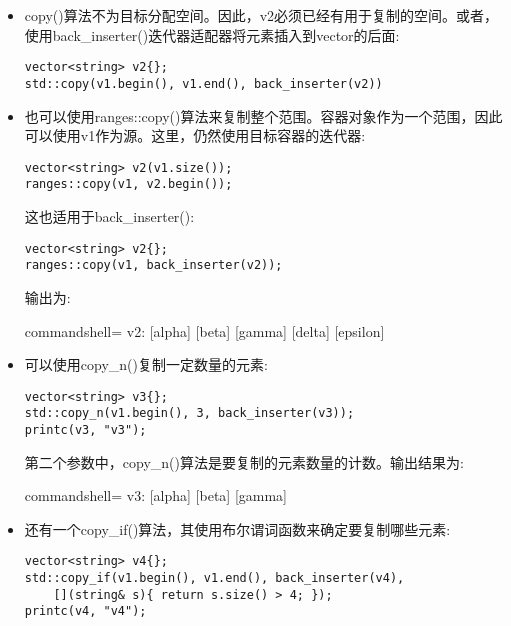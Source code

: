 \begin{itemize}
\item 
copy()算法不为目标分配空间。因此，v2必须已经有用于复制的空间。或者，使用back\_inserter()迭代器适配器将元素插入到vector的后面:

\begin{lstlisting}[style=styleCXX]
vector<string> v2{};
std::copy(v1.begin(), v1.end(), back_inserter(v2))
\end{lstlisting}

\item 
也可以使用ranges::copy()算法来复制整个范围。容器对象作为一个范围，因此可以使用v1作为源。这里，仍然使用目标容器的迭代器:

\begin{lstlisting}[style=styleCXX]
vector<string> v2(v1.size());
ranges::copy(v1, v2.begin());
\end{lstlisting}

这也适用于back\_inserter():

\begin{lstlisting}[style=styleCXX]
vector<string> v2{};
ranges::copy(v1, back_inserter(v2));
\end{lstlisting}

输出为:

\begin{tcblisting}{commandshell={}}
v2: [alpha] [beta] [gamma] [delta] [epsilon]
\end{tcblisting}

\item 
可以使用copy\_n()复制一定数量的元素:

\begin{lstlisting}[style=styleCXX]
vector<string> v3{};
std::copy_n(v1.begin(), 3, back_inserter(v3));
printc(v3, "v3");
\end{lstlisting}

第二个参数中，copy\_n()算法是要复制的元素数量的计数。输出结果为:

\begin{tcblisting}{commandshell={}}
v3: [alpha] [beta] [gamma]
\end{tcblisting}

\item 
还有一个copy\_if()算法，其使用布尔谓词函数来确定要复制哪些元素:

\begin{lstlisting}[style=styleCXX]
vector<string> v4{};
std::copy_if(v1.begin(), v1.end(), back_inserter(v4),
	[](string& s){ return s.size() > 4; });
printc(v4, "v4");
\end{lstlisting}


\end{itemize}
